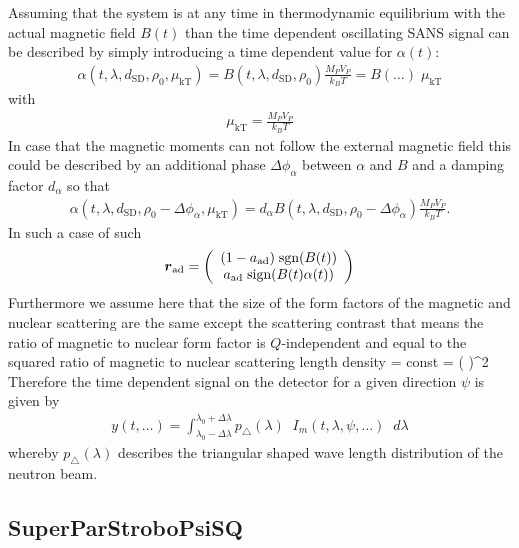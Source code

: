 Assuming that the system is at any time in thermodynamic equilibrium with the actual magnetic field $B(t)$
than the time dependent oscillating SANS signal can be described by simply  introducing a time dependent
value for $\alpha(t)$:
\begin{align}
\alpha(t,\lambda,d_\text{SD},\rho_0,\mu_\text{kT}) =
B(t,\lambda,d_\text{SD},\rho_0) \frac{M_PV_P}{k_B T} = B(\dots)\;
\mu_\text{kT}
\end{align}
with
\begin{align}
\mu_\text{kT} = \frac{M_PV_P}{k_B T}
\end{align}
In case that the magnetic moments can not follow the external magnetic field this could be described
by an additional phase $\Delta \phi_\alpha$ between $\alpha$ and $B$ and a damping factor $d_\alpha$ so that
\begin{align}
\alpha(t,\lambda,d_\text{SD},\rho_0-\Delta \phi_\alpha,\mu_\text{kT}) =
d_{\alpha} B(t,\lambda,d_\text{SD},\rho_0-\Delta \phi_\alpha) \frac{M_PV_P}{k_B T}.
\end{align}
In such a case of such
\begin{align}
\BM{r}_\text{ad} =
\left(
  \begin{array}{c}
    (1-a_\text{ad}) \; \text{sgn}(B(t)) \\
    a_\text{ad} \; \text{sign}(B(t)\alpha(t))\\
  \end{array}
\right)
\end{align}
Furthermore we assume here that the size of the form factors
of the magnetic and nuclear scattering are the same except the
scattering contrast that means the ratio of magnetic to nuclear
form factor is $Q$-independent and equal to the squared ratio of
magnetic to nuclear scattering length density
\BE
{}  = const = \left( \right)^2
\EE
Therefore the time
dependent signal on the detector for a given direction $\psi$ is given by
\begin{align}
 y(t,\dots) =
\int_{\lambda_0-\Delta\lambda}^{\lambda_0+\Delta\lambda}
    p_\triangle(\lambda) \;\; I_m(t,\lambda,\psi,\dots) \;\;  d\lambda
\end{align}
whereby $p_\triangle(\lambda)$ describes the triangular shaped
wave length distribution of the neutron beam.


\clearpage
\subsection{SuperParStroboPsiSQ}  ~\\

